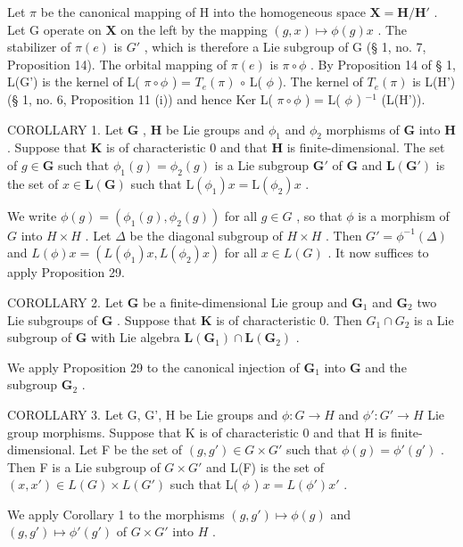 Let \(\pi\) be the canonical mapping of H into the homogeneous space \(\mathbf{X} = \mathbf{H} / \mathbf{H}'\) . Let G operate on \(\mathbf{X}\) on the left by the mapping \((g, x) \mapsto \phi(g)x\) . The stabilizer of \(\pi(e)\) is \(G'\) , which is therefore a Lie subgroup of G (§ 1, no. 7, Proposition 14). The orbital mapping of \(\pi(e)\) is \(\pi \circ \phi\) . By Proposition 14 of § 1, L(G') is the kernel of L( \(\pi \circ \phi\) ) = \(T_e(\pi)\) \(\circ\) L( \(\phi\) ). The kernel of \(T_e(\pi)\) is L(H') (§ 1, no. 6, Proposition 11 (i)) and hence Ker L( \(\pi \circ \phi\) ) = L( \(\phi\) ) \(^{-1}\) (L(H')).

COROLLARY 1. Let \(\mathbf{G}\) , \(\mathbf{H}\) be Lie groups and \(\phi_1\) and \(\phi_2\) morphisms of \(\mathbf{G}\) into \(\mathbf{H}\) . Suppose that \(\mathbf{K}\) is of characteristic 0 and that \(\mathbf{H}\) is finite-dimensional. The set of \(g \in \mathbf{G}\) such that \(\phi_1(g) = \phi_2(g)\) is a Lie subgroup \(\mathbf{G}'\) of \(\mathbf{G}\) and \(\mathbf{L}(\mathbf{G}')\) is the set of \(x \in \mathbf{L}(\mathbf{G})\) such that \(\mathrm{L}(\phi_1)x = \mathrm{L}(\phi_2)x\) .

We write \(\phi(g) = (\phi_1(g), \phi_2(g))\) for all \(g \in G\) , so that \(\phi\) is a morphism of \(G\) into \(H \times H\) . Let \(\Delta\) be the diagonal subgroup of \(H \times H\) . Then \(G' = \phi^{-1}(\Delta)\) and \(L(\phi)x = (L(\phi_1)x, L(\phi_2)x)\) for all \(x \in L(G)\) . It now suffices to apply Proposition 29.

COROLLARY 2. Let \(\mathbf{G}\) be a finite-dimensional Lie group and \(\mathbf{G}_1\) and \(\mathbf{G}_2\) two Lie subgroups of \(\mathbf{G}\) . Suppose that \(\mathbf{K}\) is of characteristic 0. Then \(G_1 \cap G_2\) is a Lie subgroup of \(\mathbf{G}\) with Lie algebra \(\mathbf{L}(\mathbf{G}_1) \cap \mathbf{L}(\mathbf{G}_2)\) .

We apply Proposition 29 to the canonical injection of \(\mathbf{G}_1\) into \(\mathbf{G}\) and the subgroup \(\mathbf{G}_2\) .

COROLLARY 3. Let G, G', H be Lie groups and \(\phi: G \to H\) and \(\phi': G' \to H\) Lie group morphisms. Suppose that K is of characteristic 0 and that H is finite-dimensional. Let F be the set of \((g, g') \in G \times G'\) such that \(\phi(g) = \phi'(g')\) . Then F is a Lie subgroup of \(G \times G'\) and L(F) is the set of \((x, x') \in L(G) \times L(G')\) such that L( \(\phi\) ) \(x = L(\phi')x'\) .

We apply Corollary 1 to the morphisms \((g, g') \mapsto \phi(g)\) and \((g, g') \mapsto \phi'(g')\) of \(G \times G'\) into \(H\) .

